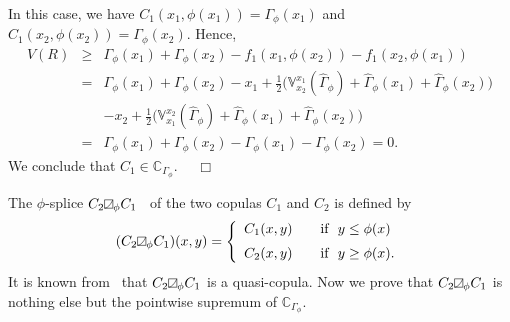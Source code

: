 \documentclass[12pt]{article}
\renewenvironment{proof}{\noindent{\bf Proof.}}{~~$\Box$}
\theoremstyle{plain}
\theoremstyle{definition}
\newcommand{\MySs}{
\begin{tikzpicture}[baseline]
\draw (0,0em) -- (0em,0.6em) -- (0.6em,0.6em) -- (0.6em,0em) -- (0,0em);
\draw (0,0em) parabola (0.6em, 0.6em);
\end{tikzpicture}}
\begin{document}
\begin{proof}
In this case, we have $C_1(x_1, \phi(x_1))=\Gamma_\phi(x_1)$ and $C_1(x_2, \phi(x_2))=\Gamma_\phi(x_2)$. Hence,
\begin{eqnarray*}
V(R)&\geq& \Gamma_\phi(x_1)+\Gamma_\phi(x_2)-f_1(x_1, \phi(x_2))-f_1(x_2, \phi(x_1))\\
&=& \Gamma_\phi(x_1)+\Gamma_\phi(x_2)-x_1+\frac{1}{2}\Big(\mathbb{V}^{x_1}_{x_2}(\hat{\Gamma}_{\phi})+\hat{\Gamma}_{\phi}(x_1)+\hat{\Gamma}_{\phi}(x_2)\Big)\\
&&- x_2+ \frac{1}{2}\Big(\mathbb{V}^{x_2}_{x_1}(\hat{\Gamma}_{\phi})+\hat{\Gamma}_{\phi}(x_1)+\hat{\Gamma}_{\phi}(x_2)\Big)\\
&=& \Gamma_\phi(x_1)+\Gamma_\phi(x_2)-\Gamma_\phi(x_1)-\Gamma_\phi(x_2)=0.
\end{eqnarray*}
We conclude that $C_1\in \mathbb{C}_{\Gamma_\phi}$.
\end{proof}

The $\phi$-splice $C_2\MySs_\phi C_1$~\cite{JDHD21} of the two copulas $C_1$ and $C_2$ is defined by
\[
(C_2\MySs_\phi C_1)(x, y)= \left \{
        \begin {array}{ll}
         C_1(x, y)
                  &\quad \text{if\ \ $y\leq\phi(x)$}  \\[2mm]
         C_2(x, y)
                  &\quad \text{if\ \ $y\geq\phi(x)$.}
        \end {array}
       \right.
\]
It is known from~\cite{XWZJ23} that $C_2\MySs_\phi C_1$ is a quasi-copula.
Now we prove that $C_2\MySs_\phi C_1$ is nothing else but the pointwise supremum of $\mathbb{C}_{\Gamma_\phi}$.
\end{document}
